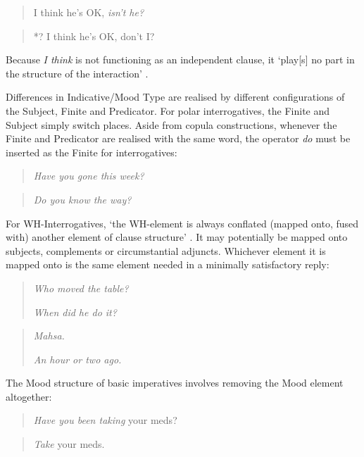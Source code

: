 \begin{multicols}{2}
\begin{quote}
I think he's OK, \emph{isn't he?}
\end{quote}

\begin{quote}
*? I think he's OK, don't I?
\end{quote}
\end{multicols}
%
\noindent Because \emph{I think} is not functioning as an independent clause, it `play[s] no part in the structure of the interaction' \cite[p.~162]{halliday_introduction_2004}.

Differences in Indicative\slash Mood Type are realised by different configurations of the Subject, Finite and Predicator. For polar interrogatives, the Finite and Subject simply switch places. Aside from copula constructions, whenever the Finite and Predicator are realised with the same word, the operator \emph{do} must be inserted as the Finite for interrogatives:

\begin{multicols}{2}
\begin{quote}
\emph{Have you gone this week?}
\end{quote}
\begin{quote}
\emph{Do you know the way?}
\end{quote}
\end{multicols}
%
\noindent For WH\hyp{}Interrogatives, `the WH\hyp{}element is always conflated (mapped onto, fused with) another element of clause structure' \cite[p.~175]{eggins_introduction_2004}. It may potentially be mapped onto subjects, complements or circumstantial adjuncts. Whichever element it is mapped onto is the same element needed in a minimally satisfactory reply:


\begin{multicols}{2}
\begin{quote}
\emph{Who moved the table?}

\emph{When did he do it?}
\end{quote}
\begin{quote}
\emph{Mahsa.}

\emph{An hour or two ago.}
\end{quote}
\end{multicols}

%
\noindent The Mood structure of basic imperatives involves removing the Mood element altogether:

\begin{multicols}{2}
\begin{quote}

\emph{Have you been taking} your meds?
\end{quote}

\begin{quote}

\emph{Take} your meds.
\end{quote}
\end{multicols}

